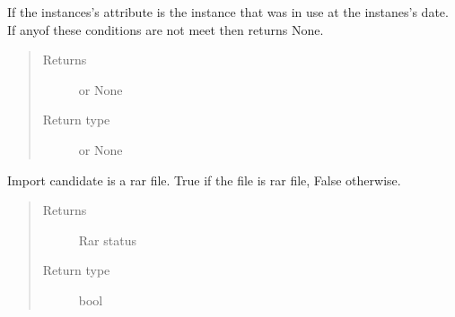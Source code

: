 \documentclass[letterpaper,10pt,english]{sphinxmanual}
\begin{document}
\begin{fulllineitems}
\begin{fulllineitems}
\label{\detokenize{polo.windows:polo.windows.run_importer.ImportCandidate.cocktail_menu}}
If the {\hyperref[\detokenize{polo.windows:polo.windows.run_importer.ImportCandidate}]{}} instances’s  
attribute is the 
instance that was in use at the {\hyperref[\detokenize{polo.windows:polo.windows.run_importer.ImportCandidate}]{}} 
instanes’s date. If anyof these conditions are not meet then
returns None.
\begin{quote}\begin{description}
\item[{Returns}] \leavevmode
{\hyperref[\detokenize{polo.utils:polo.utils.io_utils.Menu}]{}} or None

\item[{Return type}] \leavevmode
{\hyperref[\detokenize{polo.utils:polo.utils.io_utils.Menu}]{}} or None

\end{description}\end{quote}

\end{fulllineitems}


\begin{fulllineitems}
\label{\detokenize{polo.windows:polo.windows.run_importer.ImportCandidate.is_rar}}
Import candidate is a rar file. True if the file is rar file, False
otherwise.
\begin{quote}\begin{description}
\item[{Returns}] \leavevmode
Rar status

\item[{Return type}] \leavevmode
bool


\end{description}
\end{quote}
\end{fulllineitems}
\end{fulllineitems}
\end{document}
